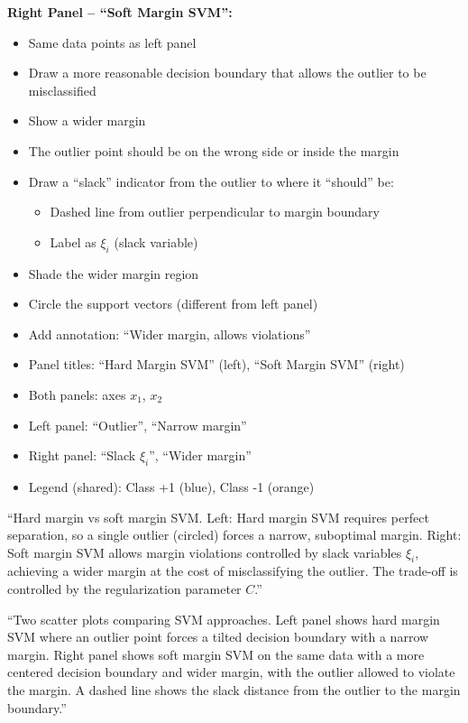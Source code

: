 \documentclass[12pt]{article}
\begin{document}
\begin{description}[style=nextline, leftmargin=0pt]
    \textbf{Right Panel -- ``Soft Margin SVM'':}
    \begin{itemize}
        \item Same data points as left panel
        \item Draw a more reasonable decision boundary that allows the outlier to be misclassified
        \item Show a wider margin
        \item The outlier point should be on the wrong side or inside the margin
        \item Draw a ``slack'' indicator from the outlier to where it ``should'' be:
        \begin{itemize}
            \item Dashed line from outlier perpendicular to margin boundary
            \item Label as $\xi_i$ (slack variable)
        \end{itemize}
        \item Shade the wider margin region
        \item Circle the support vectors (different from left panel)
        \item Add annotation: ``Wider margin, allows violations''
    \end{itemize}

    \item[Required Labels]
    \begin{itemize}
        \item Panel titles: ``Hard Margin SVM'' (left), ``Soft Margin SVM'' (right)
        \item Both panels: axes $x_1$, $x_2$
        \item Left panel: ``Outlier'', ``Narrow margin''
        \item Right panel: ``Slack $\xi_i$'', ``Wider margin''
        \item Legend (shared): Class +1 (blue), Class -1 (orange)
    \end{itemize}

    \item[Caption Text]
    ``Hard margin vs soft margin SVM. Left: Hard margin SVM requires perfect separation, so a single outlier (circled) forces a narrow, suboptimal margin. Right: Soft margin SVM allows margin violations controlled by slack variables $\xi_i$, achieving a wider margin at the cost of misclassifying the outlier. The trade-off is controlled by the regularization parameter $C$.''

    \item[Alt-Text for Accessibility]
    ``Two scatter plots comparing SVM approaches. Left panel shows hard margin SVM where an outlier point forces a tilted decision boundary with a narrow margin. Right panel shows soft margin SVM on the same data with a more centered decision boundary and wider margin, with the outlier allowed to violate the margin. A dashed line shows the slack distance from the outlier to the margin boundary.''
\end{description}
\end{document}
